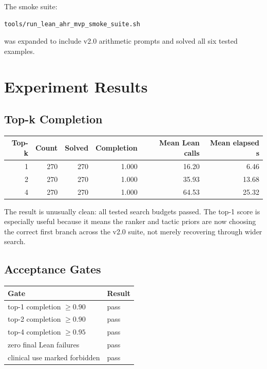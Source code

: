 \documentclass[11pt]{article}
\begin{document}
The smoke suite:

\begin{lstlisting}[style=leanstyle]
tools/run_lean_ahr_mvp_smoke_suite.sh
\end{lstlisting}

was expanded to include v2.0 arithmetic prompts and solved all six tested examples.

\section{Experiment Results}

\subsection{Top-k Completion}

\begin{center}
\begin{tabular}{rrrrrr}
\toprule
Top-k & Count & Solved & Completion & Mean Lean calls & Mean elapsed s \\
\midrule
1 & 270 & 270 & 1.000 & 16.20 & 6.46 \\
2 & 270 & 270 & 1.000 & 35.93 & 13.68 \\
4 & 270 & 270 & 1.000 & 64.53 & 25.32 \\
\bottomrule
\end{tabular}
\end{center}

The result is unusually clean: all tested search budgets passed. The top-1 score is especially useful because it
means the ranker and tactic priors are now choosing the correct first branch across the v2.0 suite, not merely
recovering through wider search.

\subsection{Acceptance Gates}

\begin{center}
\begin{tabular}{ll}
\toprule
Gate & Result \\
\midrule
top-1 completion $\ge 0.90$ & pass \\
top-2 completion $\ge 0.90$ & pass \\
top-4 completion $\ge 0.95$ & pass \\
zero final Lean failures & pass \\
clinical use marked forbidden & pass \\
\bottomrule
\end{tabular}
\end{center}
\end{document}
